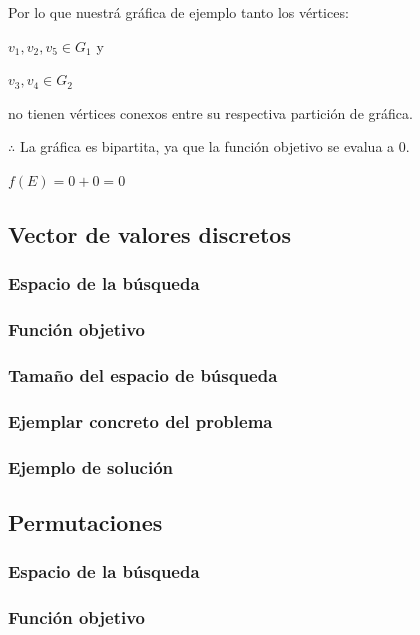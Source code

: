 \documentclass{article}
\begin{document}
Por lo que nuestrá gráfica de ejemplo tanto los vértices:

$v_1,v_2,v_5 \in G_1$ y

$v_3,v_4 \in G_2$

no tienen vértices conexos entre su respectiva partición de gráfica.

$\therefore$ La gráfica es bipartita, ya que la función objetivo se evalua a 0.

$f(E) = 0 + 0 = 0$

\newpage
\subsection*{Vector de valores discretos}

\subsubsection*{Espacio de la búsqueda}

\subsubsection*{Función objetivo}

\subsubsection*{Tamaño del espacio de búsqueda}

\subsubsection*{Ejemplar concreto del problema}

\subsubsection*{Ejemplo de solución}

\newpage
\subsection*{Permutaciones}

\subsubsection*{Espacio de la búsqueda}

\subsubsection*{Función objetivo}
\end{document}
